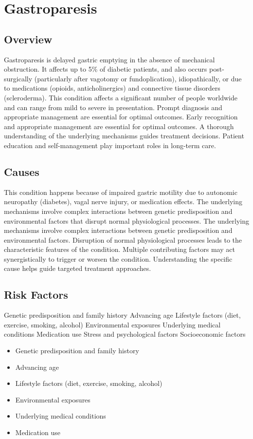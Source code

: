 \chapter{Gastroparesis}
\label{sec:Gastroparesis}

\section{Overview}
Gastroparesis is delayed gastric emptying in the absence of mechanical obstruction. It affects up to 5\% of diabetic patients, and also occurs post-surgically (particularly after vagotomy or fundoplication), idiopathically, or due to medications (opioids, anticholinergics) and connective tissue disorders (scleroderma). This condition affects a significant number of people worldwide and can range from mild to severe in presentation. Prompt diagnosis and appropriate management are essential for optimal outcomes. Early recognition and appropriate management are essential for optimal outcomes. A thorough understanding of the underlying mechanisms guides treatment decisions. Patient education and self-management play important roles in long-term care.
\section{Causes}
This condition happens because of impaired gastric motility due to autonomic neuropathy (diabetes), vagal nerve injury, or medication effects. The underlying mechanisms involve complex interactions between genetic predisposition and environmental factors that disrupt normal physiological processes. The underlying mechanisms involve complex interactions between genetic predisposition and environmental factors. Disruption of normal physiological processes leads to the characteristic features of the condition. Multiple contributing factors may act synergistically to trigger or worsen the condition. Understanding the specific cause helps guide targeted treatment approaches.
\section{Risk Factors}
Genetic predisposition and family history Advancing age Lifestyle factors (diet, exercise, smoking, alcohol) Environmental exposures Underlying medical conditions Medication use Stress and psychological factors Socioeconomic factors

\begin{itemize}[noitemsep]
  \item Genetic predisposition and family history
  \item Advancing age
  \item Lifestyle factors (diet, exercise, smoking, alcohol)
  \item Environmental exposures
  \item Underlying medical conditions
  \item Medication use
\end{itemize}

